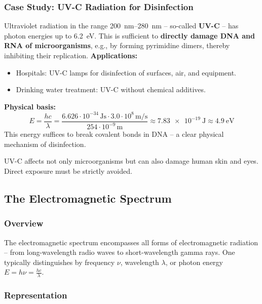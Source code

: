 \subsubsection{Case Study: UV-C Radiation for Disinfection}

Ultraviolet radiation in the range \SI{200}{nm}–\SI{280}{nm} – so-called \textbf{UV-C} – has photon energies up to \SI{6.2}{\electronvolt}. This is sufficient to \textbf{directly damage DNA and RNA of microorganisms}, e.g., by forming pyrimidine dimers, thereby inhibiting their replication.
\newpage
\noindent
\textbf{Applications:}
\begin{itemize}
	\item Hospitals: UV-C lamps for disinfection of surfaces, air, and equipment.
	\item Drinking water treatment: UV-C without chemical additives.
\end{itemize}

\textbf{Physical basis:}
$$
E = \frac{hc}{\lambda} = \frac{6.626 \cdot 10^{-34}\,\si{\joule\second} \cdot 3.0 \cdot 10^8\,\si{\meter\per\second}}{254 \cdot 10^{-9}\,\si{\meter}} \approx \SI{7.83e-19}{\joule} \approx \SI{4.9}{\electronvolt}
$$
This energy suffices to break covalent bonds in DNA – a clear physical mechanism of disinfection.
\vspace{0.5em}
\begin{tcolorbox}[physikbox, title=Note on Hazard]
	\label{box:Hinweis zur Gefärdung}
	UV-C affects not only microorganisms but can also damage human skin and eyes. Direct exposure must be strictly avoided.
\end{tcolorbox}
\newpage
\noindent
\subsection{The Electromagnetic Spectrum}

\subsubsection{Overview}

The electromagnetic spectrum encompasses all forms of electromagnetic radiation – from long-wavelength radio waves to short-wavelength gamma rays. One typically distinguishes by frequency \(\nu\), wavelength \(\lambda\), or photon energy \(E = h\nu = \tfrac{hc}{\lambda}\).

\subsubsection{Representation}

